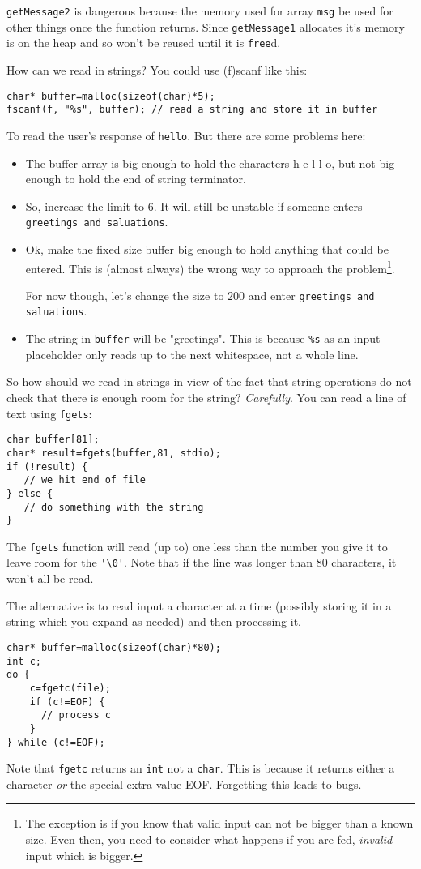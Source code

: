 \texttt{getMessage2} is dangerous because the memory used for array \texttt{msg} be used for other things once the function returns.
Since \texttt{getMessage1} allocates it's memory is on the heap and so won't be reused until it is \texttt{free}d.

How can we read in strings?
You could use (f)scanf like this:
\begin{lstlisting}
char* buffer=malloc(sizeof(char)*5);
fscanf(f, "%s", buffer); // read a string and store it in buffer
\end{lstlisting}
To read the user's response of \texttt{hello}.
But there are some problems here:
\begin{itemize}
 \item The buffer array is big enough to hold the characters h-e-l-l-o, but not big enough to hold the end of string terminator.
 \item So, increase the limit to 6. It will still be unstable if someone enters \texttt{greetings and saluations}.
 \item Ok, make the fixed size buffer big enough to hold anything that could be entered.
 This is (almost always) the wrong way to approach the problem\footnote{The exception is if you know that valid input can not be bigger than a known size.
 Even then, you need to consider what happens if you are fed, \emph{invalid} input which is bigger.}.
 
 For now though, let's change the size to 200 and enter \texttt{greetings and saluations}.
 \item The string in \texttt{buffer} will be "greetings".  
 This is because \texttt{\%s} as an input placeholder only reads up to the next whitespace, not a whole line.
\end{itemize}

So how should we read in strings in view of the fact that string operations do not check that there is enough room for the string?
\emph{Carefully}.
You can read a line of text using \texttt{fgets}:
\begin{lstlisting}
char buffer[81];
char* result=fgets(buffer,81, stdio);
if (!result) {
   // we hit end of file
} else {
   // do something with the string
}
\end{lstlisting}
The \texttt{fgets} function will read (up to) one less than the number you give it to leave room for the \lstinline!'\0'!.
Note that if the line was longer than 80 characters, it won't all be read.

The alternative is to read input a character at a time (possibly storing it in a string which you expand as needed) and then processing it.
\begin{lstlisting}
char* buffer=malloc(sizeof(char)*80);
int c;
do {
    c=fgetc(file);
    if (c!=EOF) {
      // process c
    }
} while (c!=EOF);
\end{lstlisting}
Note that \texttt{fgetc} returns an \texttt{int} not a \texttt{char}.
This is because it returns either a character \emph{or} the special extra value EOF.
Forgetting this leads to bugs.

